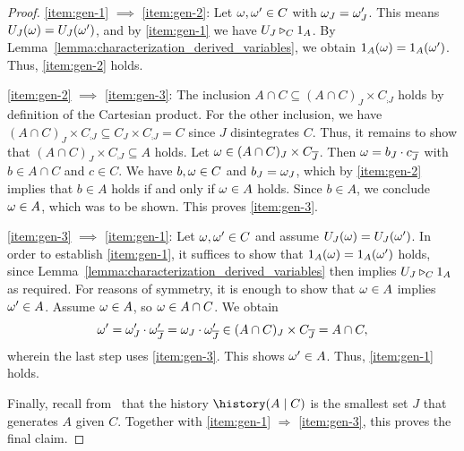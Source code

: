 \documentclass[USenglish,onecolumn]{article}
\begin{document}
\begin{proof}
  \ref{item:gen-1} $\implies$ \ref{item:gen-2}:
  Let $\omega, \omega' \in C$ with $\omega_J = \omega_J'$.
  This means $U_J(\omega) = U_J(\omega')$, and by \ref{item:gen-1} we have $U_J \triangleright_C 1_A$.
  By Lemma~\ref{lemma:characterization_derived_variables}, we obtain $1_A(\omega) = 1_A(\omega')$. Thus, \ref{item:gen-2} holds.

  \ref{item:gen-2} $\implies$ \ref{item:gen-3}:
  The inclusion $A \cap C \subseteq (A \cap C)_J \times C_{\comp{J}}$ holds by definition of the Cartesian product.
  For the other inclusion, we have
  \(
    (A \cap C)_J \times C_{\comp{J}} \subseteq C_J \times C_{\comp{J}} = C
  \)
  since $J$ disintegrates $C$.
  Thus, it remains to show that $(A \cap C)_J \times C_{\comp{J}} \subseteq A$ holds.
  Let $\omega \in (A \cap C)_J \times C_{{\overline{J}}}$.
  Then $\omega = b_J \cdot c_{{\overline{J}}}$ with $b \in A \cap C$ and $c \in C$.
  We have $b, \omega \in C$ and $b_J = \omega_J$, which by \ref{item:gen-2} implies that $b \in A$ holds if and only if $\omega \in A$ holds.
  Since $b \in A$, we conclude $\omega \in A$, which was to be shown. This proves \ref{item:gen-3}.

  \ref{item:gen-3} $\implies$ \ref{item:gen-1}:
  Let $\omega, \omega' \in C$ and assume $U_J(\omega) = U_J(\omega')$.
  In order to establish \ref{item:gen-1}, it suffices to show that $1_A(\omega) = 1_A(\omega')$ holds, since Lemma~\ref{lemma:characterization_derived_variables} then implies $U_J \triangleright_C 1_A$ as required.
  For reasons of symmetry, it is enough to show that $\omega \in A$ implies $\omega' \in A$.
  Assume $\omega \in A$, so $\omega \in A \cap C$.
  We obtain
  \begin{equation*}
    \omega' = \omega'_J \cdot \omega'_{{\overline{J}}} = \omega_J \cdot \omega'_{{\overline{J}}} \in (A \cap C)_J \times C_{{\overline{J}}} = A \cap C,
  \end{equation*}
  wherein the last step uses \ref{item:gen-3}.
  This shows $\omega' \in A$.
  Thus, \ref{item:gen-1} holds.

  Finally, recall from~ that the history $\history(A \given C)$ is the smallest set $J$ that generates $A$ given $C$. Together with \ref{item:gen-1} $\Longrightarrow$ \ref{item:gen-3}, this proves the final claim.
\end{proof}
\end{document}

